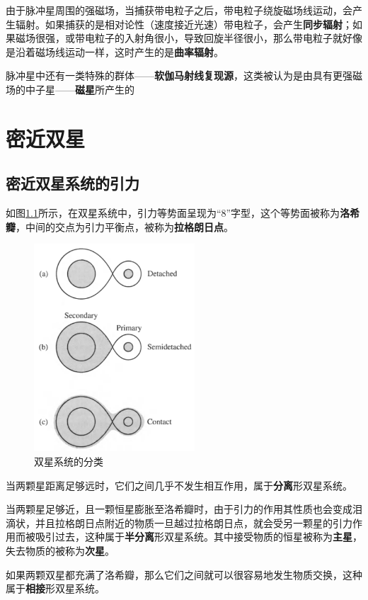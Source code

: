 \documentclass[openany]{ctexbook}
\begin{document}
由于脉冲星周围的强磁场，当捕获带电粒子之后，带电粒子绕旋磁场线运动，会产生辐射。如果捕获的是相对论性（速度接近光速）带电粒子，会产生\textbf{同步辐射}；如果磁场很强，或带电粒子的入射角很小，导致回旋半径很小，那么带电粒子就好像是沿着磁场线运动一样，这时产生的是\textbf{曲率辐射}。

脉冲星中还有一类特殊的群体——\textbf{软伽马射线复现源}，这类被认为是由具有更强磁场的中子星——\textbf{磁星}所产生的

\setcounter{chapter}{17}
\chapter{密近双星}
\section{密近双星系统的引力}
如图\ref{fig:binary}所示，在双星系统中，引力等势面呈现为``8''字型，这个等势面被称为\textbf{洛希瓣}，中间的交点为引力平衡点，被称为\textbf{拉格朗日点}。

\begin{figure}[hbt]
  \centering
  \includegraphics[width=6cm]{chapters/18/binary}
  \caption{双星系统的分类}
  \label{fig:binary}
\end{figure}

当两颗星距离足够远时，它们之间几乎不发生相互作用，属于\textbf{分离}形双星系统。

当两颗星足够近，且一颗恒星膨胀至洛希瓣时，由于引力的作用其性质也会变成泪滴状，并且拉格朗日点附近的物质一旦越过拉格朗日点，就会受另一颗星的引力作用而被吸引过去，这种属于\textbf{半分离}形双星系统。其中接受物质的恒星被称为\textbf{主星}，失去物质的被称为\textbf{次星}。

如果两颗双星都充满了洛希瓣，那么它们之间就可以很容易地发生物质交换，这种属于\textbf{相接}形双星系统。
\end{document}
